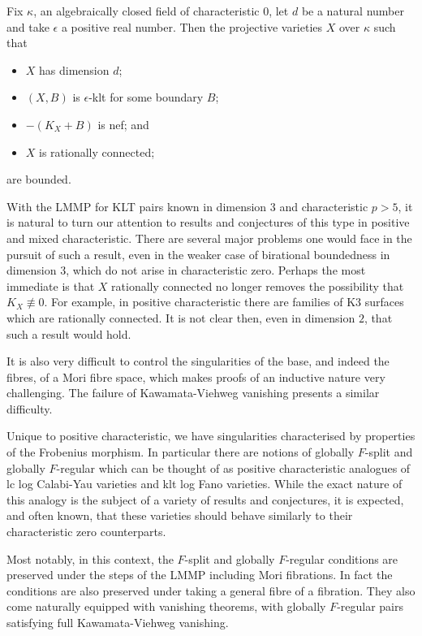 \documentclass[a4paper,12pt]{book}
\begin{document}
\begin{conjecture}
	Fix $\kappa$, an algebraically closed field of characteristic $0$, let $d$ be a natural number and take $\epsilon$ a positive real number. Then the projective varieties $X$ over $\kappa$ such that 
	\begin{itemize}
		\item $X$ has dimension $d$;
		\item $(X,B)$ is $\epsilon$-klt for some boundary $B$;
		\item $-(K_{X}+B)$ is nef; and
		\item $X$ is rationally connected;
	\end{itemize}
	are bounded.	
\end{conjecture}

With the LMMP for KLT pairs known in dimension $3$ and characteristic $p>5$, it is natural to turn our attention to results and conjectures of this type in positive and mixed characteristic. There are several major problems one would face in the pursuit of such a result, even in the weaker case of birational boundedness in dimension $3$, which do not arise in characteristic zero. Perhaps the most immediate is that $X$ rationally connected no longer removes the possibility that $K_{X} \not\equiv 0$. For example, in positive characteristic there are families of K3 surfaces which are rationally connected. It is not clear then, even in dimension $2$, that such a result would hold.

It is also very difficult to control the singularities of the base, and indeed the fibres, of a Mori fibre space, which makes proofs of an inductive nature very challenging. The failure of Kawamata-Viehweg vanishing presents a similar difficulty.

Unique to positive characteristic, we have singularities characterised by properties of the Frobenius morphism. In particular there are notions of globally $F$-split and globally $F$-regular which can be thought of as positive characteristic analogues of lc log Calabi-Yau varieties and klt log Fano varieties. While the exact nature of this analogy is the subject of a variety of results and conjectures, it is expected, and often known, that these varieties should behave similarly to their characteristic zero counterparts.

Most notably, in this context, the $F$-split and globally $F$-regular conditions are preserved under the steps of the LMMP including Mori fibrations. In fact the conditions are also preserved under taking a general fibre of a fibration. They also come naturally equipped with vanishing theorems, with globally $F$-regular pairs satisfying full Kawamata-Viehweg vanishing. 
\end{document}
